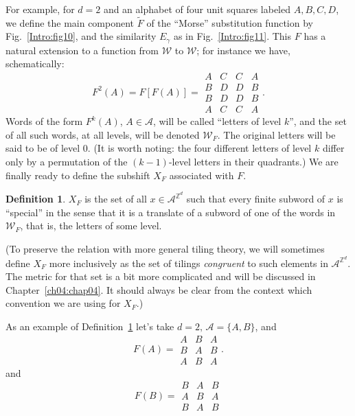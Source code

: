 \documentclass[reqno]{stml-l}
\theoremstyle{plain}
\theoremstyle{definition}
\newtheorem{definition}[theorem]{Definition}
\numberwithin{equation}{chapter}
\begin{document}
For example, for $d=2$ and an alphabet of four unit squares labeled $A,B,C,D$, we define the main component $\tilde{F}$ of the ``Morse'' substitution function by Fig.~\ref{Intro:fig10}, and the similarity $E_{\gamma}$ as in Fig.~\ref{Intro:fig11}. This $F$ has a natural extension to a function from $\mathcal{W}$ to $\mathcal{W}$; for instance we have, schematically:
\begin{equation}\label{ch01:eqn1.10}
F^{2}(A)=F[F(A)]=\begin{array}{llll}
A & C & C & A\\
B& D& D& B\\
B & D& D& B\\
A & C & C& A\end{array}.
\end{equation}
Words of the form $F^{k}(A)$, $A\in \mathcal{A}$, will be called ``letters of level $k$'', and the set of all such words, at all levels, will be denoted $\mathcal{W}_{F}$. The original letters will be said to be of level 0. (It is worth noting: the four different letters of level $k$ differ only by a permutation of the $(k-1)$-level letters in their quadrants.) We are finally ready to define the subshift $X_{F}$ associated with $F$.

\begin{definition}\label{ch01:def1.3}
$X_{F}$ is the set of all $x\in \mathcal{A}^{\mathbb{Z}^{d}}$ such that every finite subword of $x$ is ``special'' in the sense that it is a translate of a subword of one of the words in $\mathcal{W}_{F}$, that is, the letters of some level.
\end{definition}

(To preserve the relation with more general tiling theory, we will sometimes define $X_{F}$ more inclusively as the set of tilings \emph{congruent} to such elements in $\mathcal{A}^{\mathbb{Z}^{d}}$. The metric for that set is a bit more complicated and will be discussed in Chapter~\ref{ch04:chap04}. It should always be clear from the context which convention we are using for $X_{F}$.)

As an example of Definition~\ref{ch01:def1.3} let's take $d=2,\,\mathcal{A}=\{A, B\}$, and
\begin{equation}
F(A)=\begin{matrix}A & B & A\\
B & A & B\\
A & B & A \end{matrix}.
\label{ch01:eqn1.11}
\end{equation}
and
\begin{equation}
F(B)= \begin{matrix} B & A & B \\ A & B & A \\
B & A & B \end{matrix}
\label{ch01:eqn1.12}
\end{equation}
\end{document}
